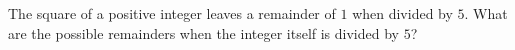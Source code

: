 The square of a positive integer leaves a remainder of $1$ when divided by $5$. What are the possible remainders when the integer itself is divided by $5$?
